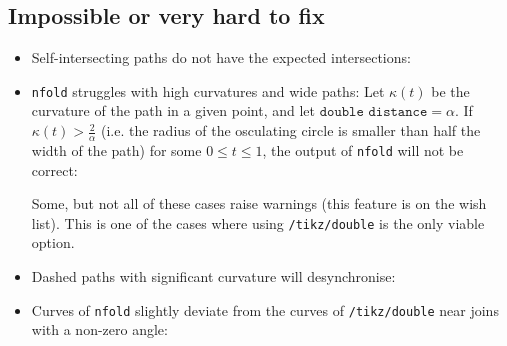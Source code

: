 \documentclass[12pt,a4paper]{article}
\theoremstyle{definition}
\newcommand{\tikzdouble}{\texttt{/tikz/double}}
\newcommand{\nfold}{\texttt{nfold}}
\begin{document}
\subsection{Impossible or very hard to fix}
\begin{itemize}
  \item Self-intersecting paths do not have the expected intersections:
\begin{tkzexample}[latex=4.5cm]
\end{tkzexample}
  \item \nfold{} struggles with high curvatures and wide paths: Let $\kappa(t)$ be the curvature of the path in a given point, and let $\texttt{double distance} = \alpha$. If $\kappa(t) > \frac{2}{\alpha}$ (i.e. the radius of the osculating circle is smaller than half the width of the path) for some $0 \leq t \leq 1$, the output of \nfold{} will not be correct:
\begin{tkzexample}[latex=4.25cm]
\end{tkzexample}
  Some, but not all of these cases raise warnings (this feature is on the wish list). This is one of the cases where using \tikzdouble{} is the only viable option.
  \item Dashed paths with significant curvature will desynchronise:
\begin{tkzexample}[latex=3cm]
\end{tkzexample}
  \item Curves of \nfold{} slightly deviate from the curves of \tikzdouble{} near joins with a non-zero angle:

\end{itemize}
\end{document}
